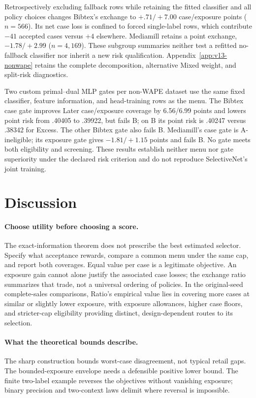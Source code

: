 \documentclass{article}
\begin{document}
Retrospectively excluding fallback rows while retaining the fitted classifier and all policy choices changes Bibtex's exchange to $+.71/+7.00$ case/exposure points ($n=566$). Its net case loss is confined to forced single-label rows, which contribute $-41$ accepted cases versus $+4$ elsewhere. Mediamill retains a point exchange, $-1.78/+2.99$ ($n=4,169$). These subgroup summaries neither test a refitted no-fallback classifier nor inherit a new risk qualification. Appendix~\ref{app:v13-nonwape} retains the complete decomposition, alternative Mixed weight, and split-risk diagnostics.

Two custom primal--dual MLP gates per non-WAPE dataset use the same fixed classifier, feature information, and head-training rows as the menu. The Bibtex case gate improves Later case/exposure coverage by 6.56/6.99 points and lowers point risk from .40405 to .39922, but fails B; on B its point risk is .40247 versus .38342 for Excess. The other Bibtex gate also fails B. Mediamill's case gate is A-ineligible; its exposure gate gives $-1.81/+1.15$ points and fails B. No gate meets both eligibility and screening. These results establish neither menu nor gate superiority under the declared risk criterion and do not reproduce SelectiveNet's joint training.

\FloatBarrier
\section{Discussion}
\paragraph{Choose utility before choosing a score.}
The exact-information theorem does not prescribe the best estimated selector. Specify what acceptance rewards, compare a common menu under the same cap, and report both coverages. Equal value per case is a legitimate objective. An exposure gain cannot alone justify the associated case losses; the exchange ratio summarizes that trade, not a universal ordering of policies. In the original-seed complete-sales comparisons, Ratio's empirical value lies in covering more cases at similar or slightly lower exposure, with exposure allowances, higher case floors, and stricter-cap eligibility providing distinct, design-dependent routes to its selection.

\paragraph{What the theoretical bounds describe.}
The sharp construction bounds worst-case disagreement, not typical retail gaps. The bounded-exposure envelope needs a defensible positive lower bound. The finite two-label example reverses the objectives without vanishing exposure; binary precision and two-context laws delimit where reversal is impossible.
\end{document}
